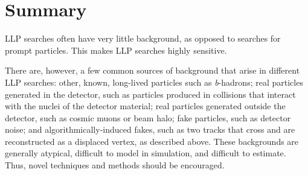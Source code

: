 \section{Summary} %

LLP searches often have very little background, as opposed to searches for prompt particles. This makes LLP searches highly sensitive.

There are, however, a few common sources of background that arise in different LLP searches: other, known, long-lived particles such as \textit{b}-hadrons; real particles generated in the detector, such as particles produced in collisions that interact with the nuclei of the detector material; real particles generated outside the detector, such as cosmic muons or beam halo; fake particles, such as detector noise; and algorithmically-induced fakes, such as two tracks that cross and are reconstructed as a displaced vertex, as described above. These backgrounds are generally atypical, difficult to model in simulation, and difficult to estimate. Thus, novel techniques and methods should be encouraged.
